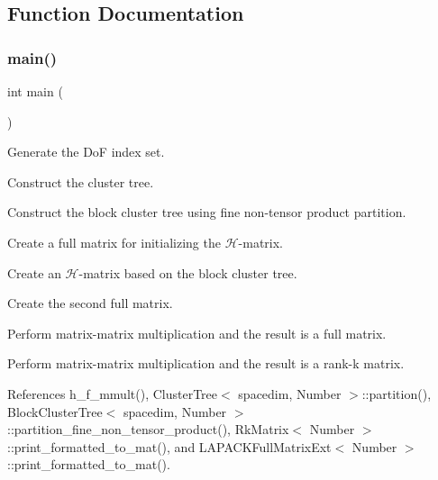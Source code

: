 \subsection{Function Documentation}
\mbox{\label{hmatrix-fullmatrix-mmult_8cc_ae66f6b31b5ad750f1fe042a706a4e3d4}} 
\subsubsection{\texorpdfstring{main()}{main()}}
{\footnotesize\ttfamily int main (\begin{DoxyParamCaption}{ }\end{DoxyParamCaption})}

Generate the DoF index set.

Construct the cluster tree.

Construct the block cluster tree using fine non-\/tensor product partition.

Create a full matrix for initializing the $\mathcal{H}$-\/matrix.

Create an $\mathcal{H}$-\/matrix based on the block cluster tree.

Create the second full matrix.

Perform matrix-\/matrix multiplication and the result is a full matrix.

Perform matrix-\/matrix multiplication and the result is a rank-\/k matrix.

References h\+\_\+f\+\_\+mmult(), Cluster\+Tree$<$ spacedim, Number $>$\+::partition(), Block\+Cluster\+Tree$<$ spacedim, Number $>$\+::partition\+\_\+fine\+\_\+non\+\_\+tensor\+\_\+product(), Rk\+Matrix$<$ Number $>$\+::print\+\_\+formatted\+\_\+to\+\_\+mat(), and L\+A\+P\+A\+C\+K\+Full\+Matrix\+Ext$<$ Number $>$\+::print\+\_\+formatted\+\_\+to\+\_\+mat().

